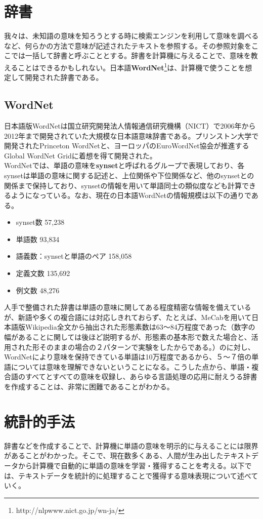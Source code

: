 \section{辞書}
我々は、未知語の意味を知ろうとする時に検索エンジンを利用して意味を調べるなど、何らかの方法で意味が記述されたテキストを参照する。その参照対象をここでは一括して辞書と呼ぶこととする。辞書を計算機に与えることで、意味を教えることはできるかもしれない。日本語\textbf{WordNet}\footnote{http://nlpwww.nict.go.jp/wn-ja/}は、計算機で使うことを想定して開発された辞書である。

\subsection{WordNet}
日本語版WordNetは国立研究開発法人情報通信研究機構（NICT）で2006年から2012年まで開発されていた大規模な日本語意味辞書である。プリンストン大学で開発されたPrinceton WordNetと、ヨーロッパのEuroWordNet協会が推進するGlobal WordNet Gridに着想を得て開発された。\\
WordNetでは、単語の意味を\textbf{synset}と呼ばれるグループで表現しており、各synsetは単語の意味に関する記述と、上位関係や下位関係など、他のsynsetとの関係まで保持しており、synsetの情報を用いて単語同士の類似度なども計算できるようになっている。なお、現在の日本語WordNetの情報規模は以下の通りである。\cite{j_WordNet}
\begin{itemize}
  \item{synset数} 57,238
  \item{単語数} 93,834
  \item{語義数：synsetと単語のペア} 158,058
  \item{定義文数} 135,692
  \item{例文数} 48,276
\end{itemize}

人手で整備された辞書は単語の意味に関してある程度精密な情報を備えているが、新語や多くの複合語には対応しきれておらず、たとえば、MeCabを用いて日本語版Wikipedia全文から抽出された形態素数は63〜84万程度であった（数字の幅があることに関しては後ほど説明するが、形態素の基本形で数えた場合と、活用された形そのままの場合の２パターンで実験をしたからである。）のに対し、WordNetにより意味を保持できている単語は10万程度であるから、５～７倍の単語については意味を理解できないということになる。こうした点から、単語・複合語のすべてとすべての意味を収録し、あらゆる言語処理の応用に耐えうる辞書を作成することは、非常に困難であることがわかる。

\newpage

\section{統計的手法}
辞書などを作成することで、計算機に単語の意味を明示的に与えることには限界があることがわかった。そこで、現在数多くある、人間が生み出したテキストデータから計算機で自動的に単語の意味を学習・獲得することを考える。以下では、テキストデータを統計的に処理することで獲得する意味表現について述べていく。

